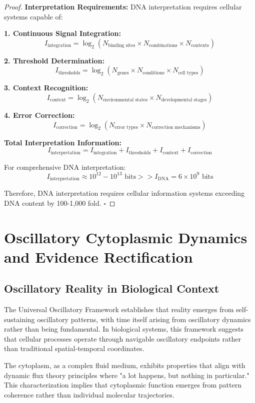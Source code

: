 \documentclass[12pt,a4paper]{article}
\begin{document}
\begin{proof}
\textbf{Interpretation Requirements:}
DNA interpretation requires cellular systems capable of:

\textbf{1. Continuous Signal Integration:}
$$I_{\text{integration}} = \log_2(N_{\text{binding sites}} \times N_{\text{combinations}} \times N_{\text{contexts}})$$

\textbf{2. Threshold Determination:}
$$I_{\text{thresholds}} = \log_2(N_{\text{genes}} \times N_{\text{conditions}} \times N_{\text{cell types}})$$

\textbf{3. Context Recognition:}
$$I_{\text{context}} = \log_2(N_{\text{environmental states}} \times N_{\text{developmental stages}})$$

\textbf{4. Error Correction:}
$$I_{\text{correction}} = \log_2(N_{\text{error types}} \times N_{\text{correction mechanisms}})$$

\textbf{Total Interpretation Information:}
$$I_{\text{interpretation}} = I_{\text{integration}} + I_{\text{thresholds}} + I_{\text{context}} + I_{\text{correction}}$$

For comprehensive DNA interpretation:
$$I_{\text{interpretation}} \approx 10^{12}-10^{13} \text{ bits} >> I_{\text{DNA}} = 6 \times 10^9 \text{ bits}$$

Therefore, DNA interpretation requires cellular information systems exceeding DNA content by 100-1,000 fold. $\square$
\end{proof}

\section{Oscillatory Cytoplasmic Dynamics and Evidence Rectification}

\subsection{Oscillatory Reality in Biological Context}

The Universal Oscillatory Framework establishes that reality emerges from self-sustaining oscillatory patterns, with time itself arising from oscillatory dynamics rather than being fundamental. In biological systems, this framework suggests that cellular processes operate through navigable oscillatory endpoints rather than traditional spatial-temporal coordinates.

The cytoplasm, as a complex fluid medium, exhibits properties that align with dynamic flux theory principles where "a lot happens, but nothing in particular." This characterization implies that cytoplasmic function emerges from pattern coherence rather than individual molecular trajectories.
\end{document}
